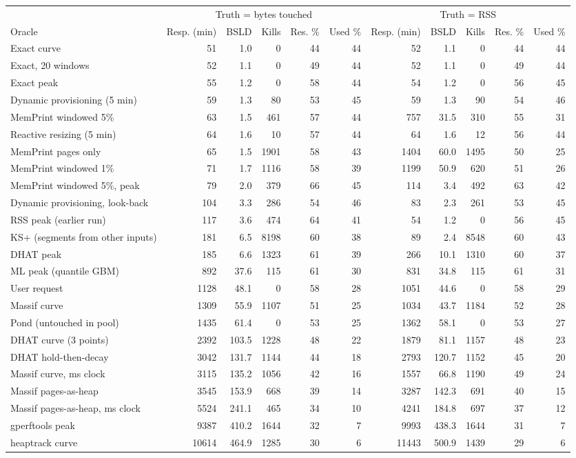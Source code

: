 \begin{tabular}{lrrrrrrrrrr}
\toprule
 & \multicolumn{5}{c}{Truth = bytes touched} & \multicolumn{5}{c}{Truth = RSS} \\
\cmidrule(lr){2-6} \cmidrule(lr){7-11}
Oracle & Resp. (min) & BSLD & Kills & Res. \% & Used \% & Resp. (min) & BSLD & Kills & Res. \% & Used \% \\
\midrule
Exact curve & 51 & 1.0 & 0 & 44 & 44 & 52 & 1.1 & 0 & 44 & 44 \\
Exact, 20 windows & 52 & 1.1 & 0 & 49 & 44 & 52 & 1.1 & 0 & 49 & 44 \\
Exact peak & 55 & 1.2 & 0 & 58 & 44 & 54 & 1.2 & 0 & 56 & 45 \\
Dynamic provisioning (5 min) & 59 & 1.3 & 80 & 53 & 45 & 59 & 1.3 & 90 & 54 & 46 \\
MemPrint windowed 5\% & 63 & 1.5 & 461 & 57 & 44 & 757 & 31.5 & 310 & 55 & 31 \\
Reactive resizing (5 min) & 64 & 1.6 & 10 & 57 & 44 & 64 & 1.6 & 12 & 56 & 44 \\
MemPrint pages only & 65 & 1.5 & 1901 & 58 & 43 & 1404 & 60.0 & 1495 & 50 & 25 \\
MemPrint windowed 1\% & 71 & 1.7 & 1116 & 58 & 39 & 1199 & 50.9 & 620 & 51 & 26 \\
MemPrint windowed 5\%, peak & 79 & 2.0 & 379 & 66 & 45 & 114 & 3.4 & 492 & 63 & 42 \\
Dynamic provisioning, look-back & 104 & 3.3 & 286 & 54 & 46 & 83 & 2.3 & 261 & 53 & 45 \\
RSS peak (earlier run) & 117 & 3.6 & 474 & 64 & 41 & 54 & 1.2 & 0 & 56 & 45 \\
KS+ (segments from other inputs) & 181 & 6.5 & 8198 & 60 & 38 & 89 & 2.4 & 8548 & 60 & 43 \\
DHAT peak & 185 & 6.6 & 1323 & 61 & 39 & 266 & 10.1 & 1310 & 60 & 37 \\
ML peak (quantile GBM) & 892 & 37.6 & 115 & 61 & 30 & 831 & 34.8 & 115 & 61 & 31 \\
User request & 1128 & 48.1 & 0 & 58 & 28 & 1051 & 44.6 & 0 & 58 & 29 \\
Massif curve & 1309 & 55.9 & 1107 & 51 & 25 & 1034 & 43.7 & 1184 & 52 & 28 \\
Pond (untouched in pool) & 1435 & 61.4 & 0 & 53 & 25 & 1362 & 58.1 & 0 & 53 & 27 \\
DHAT curve (3 points) & 2392 & 103.5 & 1228 & 48 & 22 & 1879 & 81.1 & 1157 & 48 & 23 \\
DHAT hold-then-decay & 3042 & 131.7 & 1144 & 44 & 18 & 2793 & 120.7 & 1152 & 45 & 20 \\
Massif curve, ms clock & 3115 & 135.2 & 1056 & 42 & 16 & 1557 & 66.8 & 1190 & 49 & 24 \\
Massif pages-as-heap & 3545 & 153.9 & 668 & 39 & 14 & 3287 & 142.3 & 691 & 40 & 15 \\
Massif pages-as-heap, ms clock & 5524 & 241.1 & 465 & 34 & 10 & 4241 & 184.8 & 697 & 37 & 12 \\
gperftools peak & 9387 & 410.2 & 1644 & 32 & 7 & 9993 & 438.3 & 1644 & 31 & 7 \\
heaptrack curve & 10614 & 464.9 & 1285 & 30 & 6 & 11443 & 500.9 & 1439 & 29 & 6 \\
\bottomrule
\end{tabular}
